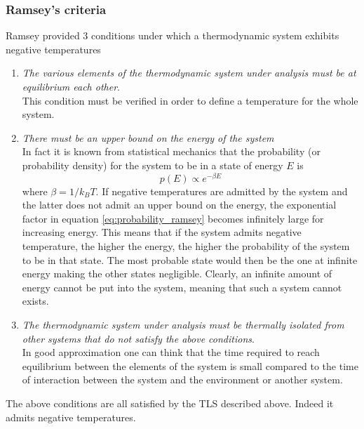 \subsubsection*{Ramsey's criteria}
Ramsey %
provided 3 conditions under which a thermodynamic system exhibits negative temperatures
\begin{enumerate}
    \item \emph{The various elements of the thermodynamic system under analysis must be at equilibrium each other}. \\
    This condition must be verified in order to define a temperature for the whole system.
    \item \emph{There must be an upper bound on the energy of the system} \\
    In fact it is known from statistical mechanics that the probability (or probability density) for the system to be in a state of energy $E$ is 
    \begin{equation}
        p(E) \propto e^{-\beta E}
        \label{eq:probability_ramsey}
    \end{equation}
    where $\beta = 1/k_BT$. If negative temperatures are admitted by the system and the latter does not admit an upper bound on the energy, the exponential factor in equation \ref{eq:probability_ramsey}
    becomes infinitely large for increasing energy. This means that if the system admits negative temperature, the higher the energy, the higher the probability of the system to be in that state. The most probable state 
    would then be the one at infinite energy making the other states negligible. Clearly, an infinite amount of energy cannot be put into the system, meaning that such a system cannot exists.
    \item \emph{The thermodynamic system under analysis must be thermally isolated from other systems that do not satisfy the above conditions}. \\
    In good approximation one can think that the time required to reach equilibrium between the elements of the system is small compared to the time of interaction
    between the system and the environment or another system.
\end{enumerate}
The above conditions are all satisfied by the TLS described above. Indeed it admits negative temperatures.